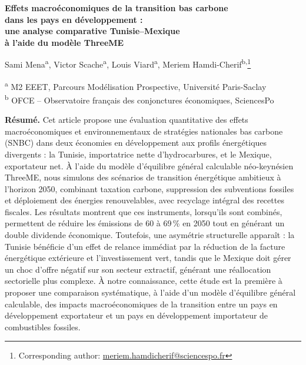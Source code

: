 \documentclass[12pt, a4paper]{article}
\begin{document}
\begin{titlepage}
\centering
\vspace*{1cm}

{\LARGE\bfseries Effets macroéconomiques de la transition bas carbone\\
dans les pays en développement :\\
une analyse comparative Tunisie--Mexique\\
à l'aide du modèle ThreeME\par}

\vspace{1.5cm}

{\large Sami Mena\textsuperscript{a}, Victor Scache\textsuperscript{a}, Louis Viard\textsuperscript{a}, Meriem Hamdi-Cherif\textsuperscript{b,}\footnote{Corresponding author: \href{mailto:meriem.hamdicherif@sciencespo.fr}{meriem.hamdicherif@sciencespo.fr}}\par}

\vspace{0.8cm}

{\normalsize \textsuperscript{a} M2 EEET, Parcours Modélisation Prospective, Université Paris-Saclay\\
\textsuperscript{b} OFCE -- Observatoire français des conjonctures économiques, SciencesPo\par}

\vspace{1.5cm}

\textbf{Résumé.} Cet article propose une évaluation quantitative des effets macroéconomiques et environnementaux de stratégies nationales bas carbone (SNBC) dans deux économies en développement aux profils énergétiques divergents : la Tunisie, importatrice nette d'hydrocarbures, et le Mexique, exportateur net. À l'aide du modèle d'équilibre général calculable néo-keynésien ThreeME, nous simulons des scénarios de transition énergétique ambitieux à l'horizon 2050, combinant taxation carbone, suppression des subventions fossiles et déploiement des énergies renouvelables, avec recyclage intégral des recettes fiscales. Les résultats montrent que ces instruments, lorsqu'ils sont combinés, permettent de réduire les émissions de 60 à 69\,\% en 2050 tout en générant un double dividende économique. Toutefois, une asymétrie structurelle apparaît : la Tunisie bénéficie d'un effet de relance immédiat par la réduction de la facture énergétique extérieure et l'investissement vert, tandis que le Mexique doit gérer un choc d'offre négatif sur son secteur extractif, générant une réallocation sectorielle plus complexe. À notre connaissance, cette étude est la première à proposer une comparaison systématique, à l'aide d'un modèle d'équilibre général calculable, des impacts macroéconomiques de la transition entre un pays en développement exportateur et un pays en développement importateur de combustibles fossiles.


\end{titlepage}
\end{document}
